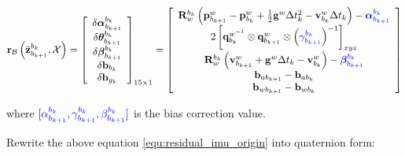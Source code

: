 \documentclass[12pt]{report}   %
\begin{document}
\begin{equation}
\label{equ:residual_imu_origin}
\mathbf{r}_{\mathcal{B}}\left(\hat{\mathbf{z}}_{b_{k+1}}^{b_{k}}, \mathcal{X}\right) 
=
\left[\begin{array}{c}
{\delta \boldsymbol{\alpha}_{b_{k+1}}^{b_{k}}} \\ 
{\delta \boldsymbol{\theta}_{b_{k+1}}^{b_{k}}} \\
{\delta \boldsymbol{\beta}_{b_{k+1}}^{b_{k}}} \\ 
{\delta \mathbf{b}_{b_{k}}} \\ 
{\delta \mathbf{b}_{g_{k}}}
\end{array}\right]_{15 \times 1} 
= 
\left[\begin{array}{c}
{\mathbf{R}_{w}^{b_{k}}
	\left(\mathbf{p}_{b_{k+1}}^{w}-\mathbf{p}_{b_{k}}^{w}+\frac{1}{2} \mathbf{g}^{w} \Delta t_{k}^{2}-\mathbf{v}_{b_{k}}^{w} \Delta t_{k}\right)-
	\color{blue}{\boldsymbol{\alpha}_{b_{k+1}}^{b_{k}}}} \\ 
{2\left[\mathbf{q}_{b_{k}}^{w^{-1}} \otimes \mathbf{q}_{b_{k+1}}^{w} \otimes\left({\color{blue}{{\gamma}_{b_{k+1}}^{b_{k}}}}\right)^{-1}\right]_{x y z}} \\
{\mathbf{R}_{w}^{b_{k}}\left(\mathbf{v}_{b_{k+1}}^{w}+\mathbf{g}^{w} \Delta t_{k}-\mathbf{v}_{b_{k}}^{w}\right) - \color{blue}{\boldsymbol{\beta}}_{b_{k+1}}^{b_{k}}} \\  
{\mathbf{b}_{a b_{k+1}}-\mathbf{b}_{a b_{k}}} \\ 
{\mathbf{b}_{w b_{k+1}}-\mathbf{b}_{w b_{k}}}
\end{array}\right]
\end{equation}

where $[\color{blue}{{\alpha}^{b_{k}}_{b_{k+1}},{\gamma}^{b_{k}}_{b_{k+1}},{\beta}^{b_{k}}_{b_{k+1}}}]$ is the bias correction value.

Rewrite the above equation \eqref{equ:residual_imu_origin} into quaternion form:
\end{document}
